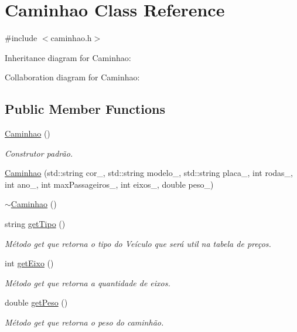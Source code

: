 \hypertarget{classCaminhao}{}\section{Caminhao Class Reference}
\label{classCaminhao}


{\ttfamily \#include $<$caminhao.\+h$>$}



Inheritance diagram for Caminhao\+:


Collaboration diagram for Caminhao\+:
\subsection*{Public Member Functions}
\begin{DoxyCompactItemize}
\item 
\hyperlink{classCaminhao_ae2621d6abfa0d9be4c3e3d6ae44a8b88}{Caminhao} ()
\begin{DoxyCompactList}\small\item\em Construtor padrão. \end{DoxyCompactList}\item 
\hyperlink{classCaminhao_af3cdf63c2b7ff42d61649b1fdb4b540b}{Caminhao} (std\+::string cor\+\_\+, std\+::string modelo\+\_\+, std\+::string placa\+\_\+, int rodas\+\_\+, int ano\+\_\+, int max\+Passageiros\+\_\+, int eixos\+\_\+, double peso\+\_\+)
\item 
\hyperlink{classCaminhao_acb8ab61e39d44e1a0e83d2810582ddee}{$\sim$\+Caminhao} ()
\item 
string \hyperlink{classCaminhao_aa1d2138301b0c5c8c2e022309ab55bc0}{get\+Tipo} ()
\begin{DoxyCompactList}\small\item\em Método get que retorna o tipo do Veículo que será util na tabela de preços. \end{DoxyCompactList}\item 
int \hyperlink{classCaminhao_a2f23320651bb9eacb11ac5b260241456}{get\+Eixo} ()
\begin{DoxyCompactList}\small\item\em Método get que retorna a quantidade de eixos. \end{DoxyCompactList}\item 
double \hyperlink{classCaminhao_a309d69ad26e53f1d704a2878b2c7b17a}{get\+Peso} ()
\begin{DoxyCompactList}\small\item\em Método get que retorna o peso do caminhão. \end{DoxyCompactList}\item 

\end{DoxyCompactItemize}

